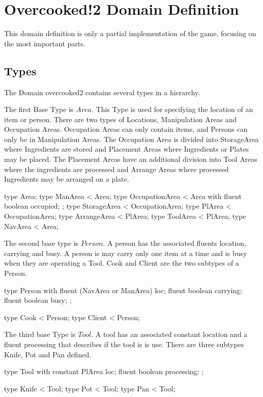 %
\appendix

\section{Overcooked!2 Domain Definition}

This domain definition is only a partial implementation of the game, focusing on the most important parts.


\subsection{Types}
The Domain overcooked2 contains several types in a hierarchy.

The first Base Type is $Area$.
This Type is used for specifying the location of an item or person. There are two types of Locations, Manipulation Areas and Occupation Areas.
Occupation Areas can only contain items, and Persons can only be in Manipulation Areas.
The Occupation Area is divided into StorageArea where Ingredients are stored and Placement Areas where Ingredients or Plates may be placed.
The Placement Areas have an additional division into Tool Areas where the ingredients are processed and Arrange Areas where processed Ingredients may be arranged on a plate.

\begin{anmlcode}
type Area;
type ManArea < Area;
type OccupationArea < Area with {
  fluent boolean occupied;
};
type StorageArea < OccupationArea;
type PlArea < OccupationArea;
type ArrangeArea < PlArea;
type ToolArea < PlArea;
type NavArea < Area;
\end{anmlcode}

The second base type is $Person$.
A person has the associated fluents location, carrying and busy.
A person is may carry only one item at a time and is busy when they are operating a Tool.
Cook and Client are the two subtypes of a Person.

\begin{anmlcode}
type Person with {
  fluent (NavArea or ManArea) loc;
  fluent boolean carrying;
  fluent boolean busy;
};

type Cook < Person;
type Client < Person;
\end{anmlcode}

The third base Type is $Tool$. A tool has an associated constant location and a fluent processing that describes if the tool is is use.
There are three subtypes Knife, Pot and Pan defined.

\begin{anmlcode}
type Tool with {
  constant PlArea loc;
  fluent boolean processing;
};

type Knife < Tool;
type Pot < Tool;
type Pan < Tool;
\end{anmlcode}

